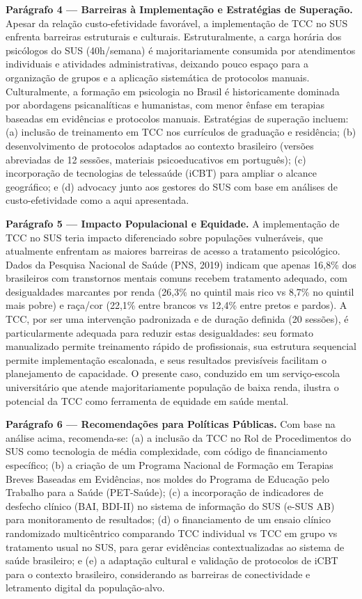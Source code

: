 \documentclass[12pt,a4paper]{article}
\begin{document}
\textbf{Parágrafo 4 — Barreiras à Implementação e Estratégias de Superação.} Apesar da relação custo-efetividade favorável, a implementação de TCC no SUS enfrenta barreiras estruturais e culturais. Estruturalmente, a carga horária dos psicólogos do SUS (40h/semana) é majoritariamente consumida por atendimentos individuais e atividades administrativas, deixando pouco espaço para a organização de grupos e a aplicação sistemática de protocolos manuais. Culturalmente, a formação em psicologia no Brasil é historicamente dominada por abordagens psicanalíticas e humanistas, com menor ênfase em terapias baseadas em evidências e protocolos manuais. Estratégias de superação incluem: (a) inclusão de treinamento em TCC nos currículos de graduação e residência; (b) desenvolvimento de protocolos adaptados ao contexto brasileiro (versões abreviadas de 12 sessões, materiais psicoeducativos em português); (c) incorporação de tecnologias de telessaúde (iCBT) para ampliar o alcance geográfico; e (d) advocacy junto aos gestores do SUS com base em análises de custo-efetividade como a aqui apresentada.

\textbf{Parágrafo 5 — Impacto Populacional e Equidade.} A implementação de TCC no SUS teria impacto diferenciado sobre populações vulneráveis, que atualmente enfrentam as maiores barreiras de acesso a tratamento psicológico. Dados da Pesquisa Nacional de Saúde (PNS, 2019) indicam que apenas 16,8\% dos brasileiros com transtornos mentais comuns recebem tratamento adequado, com desigualdades marcantes por renda (26,3\% no quintil mais rico vs 8,7\% no quintil mais pobre) e raça/cor (22,1\% entre brancos vs 12,4\% entre pretos e pardos). A TCC, por ser uma intervenção padronizada e de duração definida (20 sessões), é particularmente adequada para reduzir estas desigualdades: seu formato manualizado permite treinamento rápido de profissionais, sua estrutura sequencial permite implementação escalonada, e seus resultados previsíveis facilitam o planejamento de capacidade. O presente caso, conduzido em um serviço-escola universitário que atende majoritariamente população de baixa renda, ilustra o potencial da TCC como ferramenta de equidade em saúde mental.

\textbf{Parágrafo 6 — Recomendações para Políticas Públicas.} Com base na análise acima, recomenda-se: (a) a inclusão da TCC no Rol de Procedimentos do SUS como tecnologia de média complexidade, com código de financiamento específico; (b) a criação de um Programa Nacional de Formação em Terapias Breves Baseadas em Evidências, nos moldes do Programa de Educação pelo Trabalho para a Saúde (PET-Saúde); (c) a incorporação de indicadores de desfecho clínico (BAI, BDI-II) no sistema de informação do SUS (e-SUS AB) para monitoramento de resultados; (d) o financiamento de um ensaio clínico randomizado multicêntrico comparando TCC individual vs TCC em grupo vs tratamento usual no SUS, para gerar evidências contextualizadas ao sistema de saúde brasileiro; e (e) a adaptação cultural e validação de protocolos de iCBT para o contexto brasileiro, considerando as barreiras de conectividade e letramento digital da população-alvo.
\end{document}
